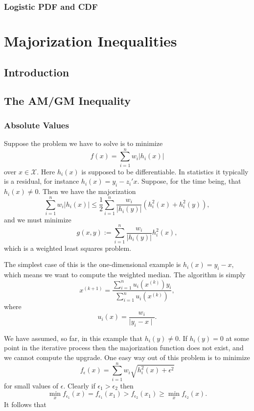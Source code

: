 \documentclass[
  12pt,
]{book}
\begin{document}
\hypertarget{logistic-pdf-and-cdf}{%
\subsection{Logistic PDF and CDF}\label{logistic-pdf-and-cdf}}

\hypertarget{majorization-inequalities}{%
\chapter{Majorization Inequalities}\label{majorization-inequalities}}

\hypertarget{introduction-3}{%
\section{Introduction}\label{introduction-3}}

\hypertarget{the-amgm-inequality}{%
\section{The AM/GM Inequality}\label{the-amgm-inequality}}

\hypertarget{absolute-values}{%
\subsection{Absolute Values}\label{absolute-values}}

Suppose the problem we have to solve is to minimize
\[
f(x)=\sum_{i=1}^nw_i|h_i(x)|
\]
over \(x\in\mathcal{X}.\)
Here \(h_i(x)\) is supposed to be differentiable. In statistics it typically is
a residual,
for instance \(h_i(x)=y_i-z_i'x.\) Suppose, for the time being, that \(h_i(x)\not= 0\). Then we have the majorization
\[
\sum_{i=1}^nw_i|h_i(x)|\leq
\frac{1}{2}\sum_{i=1}^n\frac{w_i}{|h_i(y)|}
(h^2_i(x)+h^2_i(y)),
\]
and we must minimize
\[
g(x,y):=\sum_{i=1}^n\frac{w_i}{|h_i(y)|}h^2_i(x),
\]
which is a weighted least squares problem.

The simplest case of this is the one-dimensional example
is \(h_i(x)=y_i-x\),
which means we want to compute the weighted median. The algorithm is simply
\[
x^{(k+1)}=\frac{\sum_{i=1}^n u_i(x^{(k)})y_i}{\sum_{i=1}^n u_i(x^{(k)})},
\]
where
\[
u_i(x)=\frac{w_i}{\mid y_i-x\mid}.
\]

We have assumed, so far, in this example that \(h_i(y)\not= 0\).
If \(h_i(y)=0\) at some point in the iterative process then the majorization function does not exist, and we cannot compute the upgrade. One easy way out of this problem is to minimize
\[
f_\epsilon(x)=\sum_{i=1}^nw_i\sqrt{h_i^2(x)+\epsilon^2}
\]
for small values of \(\epsilon\). Clearly if \(\epsilon_1>\epsilon_2\)
then
\[
\min_x f_{\epsilon_1}(x)=f_{\epsilon_1}(x_1)>f_{\epsilon_2}(x_1)\geq\min_x f_{\epsilon_2}(x).
\]
It follows that
\end{document}
